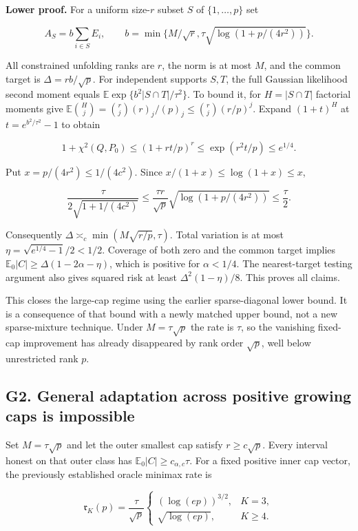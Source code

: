 \documentclass[
  10pt,
]{article}
\begin{document}
\textbf{Lower proof.} For a uniform size-\(r\) subset \(S\) of
\(\{1,\ldots,p\}\) set

\[A_S=b\sum_{i\in S}E_i,\qquad
b=\min\{M/\sqrt r,\tau\sqrt{\log(1+p/(4r^2))}\}.\]

All constrained unfolding ranks are \(r\), the norm is at most \(M\),
and the common target is \(\Delta=rb/\sqrt p\). For independent supports
\(S,T\), the full Gaussian likelihood second moment equals
\(\mathbb E\exp\{b^2|S\cap T|/\tau^2\}\). To bound it, for
\(H=|S\cap T|\) factorial moments give
\(\mathbb E\binom Hj=\binom rj(r)_j/(p)_j\le\binom rj(r/p)^j\). Expand
\((1+t)^H\) at \(t=e^{b^2/\tau^2}-1\) to obtain

\[1+\chi^2(Q,P_0)\le(1+rt/p)^r\le\exp(r^2t/p)\le e^{1/4}.\]

Put \(x=p/(4r^2)\le1/(4c^2)\). Since \(x/(1+x)\le\log(1+x)\le x\),

\[\frac{\tau}{2\sqrt{1+1/(4c^2)}}
\le\frac{\tau r}{\sqrt p}\sqrt{\log(1+p/(4r^2))}\le\frac\tau2.\]

Consequently \(\Delta\asymp_c\min(M\sqrt{r/p},\tau)\). Total variation
is at most \(\eta=\sqrt{e^{1/4}-1}/2<1/2\). Coverage of both zero and
the common target implies \(\mathbb E_0|C|\ge\Delta(1-2\alpha-\eta)\),
which is positive for \(\alpha<1/4\). The nearest-target testing
argument also gives squared risk at least \(\Delta^2(1-\eta)/8\). This
proves all claims.

This closes the large-cap regime using the earlier sparse-diagonal lower
bound. It is a consequence of that bound with a newly matched upper
bound, not a new sparse-mixture technique. Under \(M=\tau\sqrt p\) the
rate is \(\tau\), so the vanishing fixed-cap improvement has already
disappeared by rank order \(\sqrt p\), well below unrestricted rank
\(p\).

\subsection{G2. General adaptation across positive growing caps is
impossible}\label{g2.-general-adaptation-across-positive-growing-caps-is-impossible}

Set \(M=\tau\sqrt p\) and let the outer smallest cap satisfy
\(r\ge c\sqrt p\). Every interval honest on that outer class has
\(\mathbb E_0|C|\ge c_{\alpha,c}\tau\). For a fixed positive inner cap
vector, the previously established oracle minimax rate is

\[\mathfrak r_K(p)=\frac\tau{\sqrt p}
\begin{cases}(\log(ep))^{3/2},&K=3,\\
\sqrt{\log(ep)},&K\ge4.
\end{cases}\]
\end{document}
